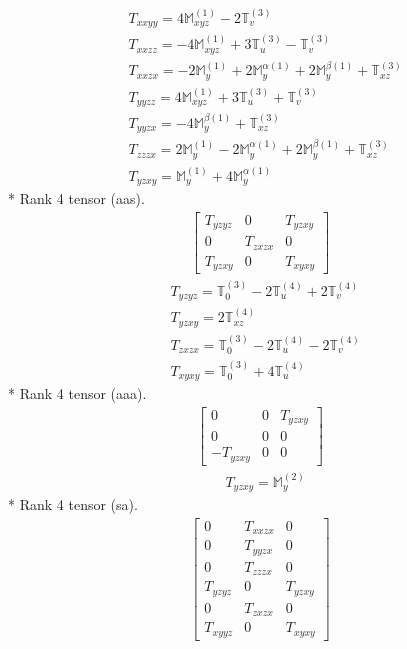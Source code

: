 \documentclass[fleqn,8pt,landscape]{jsarticle}
\begin{document}
\begin{align*}
& T_{xxyy} = 4 \mathbb{M}_{xyz}^{(1)} - 2 \mathbb{T}_{v}^{(3)} \\
& T_{xxzz} = - 4 \mathbb{M}_{xyz}^{(1)} + 3 \mathbb{T}_{u}^{(3)} - \mathbb{T}_{v}^{(3)} \\
& T_{xxzx} = - 2 \mathbb{M}_{y}^{(1)} + 2 \mathbb{M}_{y}^{\alpha(1)} + 2 \mathbb{M}_{y}^{\beta(1)} + \mathbb{T}_{xz}^{(3)} \\
& T_{yyzz} = 4 \mathbb{M}_{xyz}^{(1)} + 3 \mathbb{T}_{u}^{(3)} + \mathbb{T}_{v}^{(3)} \\
& T_{yyzx} = - 4 \mathbb{M}_{y}^{\beta(1)} + \mathbb{T}_{xz}^{(3)} \\
& T_{zzzx} = 2 \mathbb{M}_{y}^{(1)} - 2 \mathbb{M}_{y}^{\alpha(1)} + 2 \mathbb{M}_{y}^{\beta(1)} + \mathbb{T}_{xz}^{(3)} \\
& T_{yzxy} = \mathbb{M}_{y}^{(1)} + 4 \mathbb{M}_{y}^{\alpha(1)}
\end{align*}
* Rank 4 tensor (aas).
\begin{align*}
\begin{bmatrix} T_{yzyz} & 0 & T_{yzxy} \\ 0 & T_{zxzx} & 0 \\ T_{yzxy} & 0 & T_{xyxy} \end{bmatrix}
\end{align*}
\begin{align*}
& T_{yzyz} = \mathbb{T}_{0}^{(3)} - 2 \mathbb{T}_{u}^{(4)} + 2 \mathbb{T}_{v}^{(4)} \\
& T_{yzxy} = 2 \mathbb{T}_{xz}^{(4)} \\
& T_{zxzx} = \mathbb{T}_{0}^{(3)} - 2 \mathbb{T}_{u}^{(4)} - 2 \mathbb{T}_{v}^{(4)} \\
& T_{xyxy} = \mathbb{T}_{0}^{(3)} + 4 \mathbb{T}_{u}^{(4)}
\end{align*}
* Rank 4 tensor (aaa).
\begin{align*}
\begin{bmatrix} 0 & 0 & T_{yzxy} \\ 0 & 0 & 0 \\ - T_{yzxy} & 0 & 0 \end{bmatrix}
\end{align*}
\begin{align*}
& T_{yzxy} = \mathbb{M}_{y}^{(2)}
\end{align*}
* Rank 4 tensor (sa).
\begin{align*}
\begin{bmatrix} 0 & T_{xxzx} & 0 \\ 0 & T_{yyzx} & 0 \\ 0 & T_{zzzx} & 0 \\ T_{yzyz} & 0 & T_{yzxy} \\ 0 & T_{zxzx} & 0 \\ T_{xyyz} & 0 & T_{xyxy} \end{bmatrix}
\end{align*}
\end{document}
